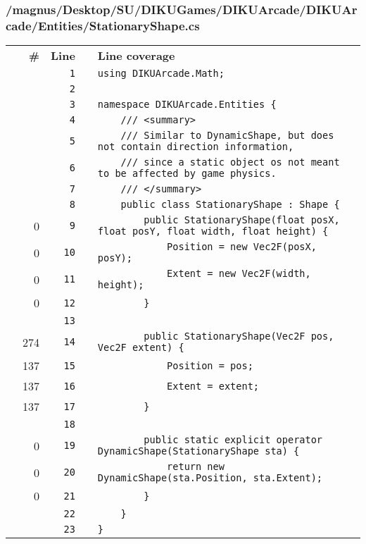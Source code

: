 \documentclass[a4paper,landscape,10pt]{article}
\begin{document}
\subsubsection{/magnus/Desktop/SU/DIKUGames/DIKUArcade/DIKUArcade/Entities/StationaryShape.cs}
\begin{longtable}[l]{lrrll}
\textbf{} & \textbf{\#} & \textbf{Line} & \textbf{} & \textbf{Line coverage}\\
\cellcolor{gray} &  & \verb~1~ & & \verb~using DIKUArcade.Math;~\\
\cellcolor{gray} &  & \verb~2~ & & \verb~~\\
\cellcolor{gray} &  & \verb~3~ & & \verb~namespace DIKUArcade.Entities {~\\
\cellcolor{gray} &  & \verb~4~ & & \verb~    /// <summary>~\\
\cellcolor{gray} &  & \verb~5~ & & \verb~    /// Similar to DynamicShape, but does not contain direction information,~\\
\cellcolor{gray} &  & \verb~6~ & & \verb~    /// since a static object os not meant to be affected by game physics.~\\
\cellcolor{gray} &  & \verb~7~ & & \verb~    /// </summary>~\\
\cellcolor{gray} &  & \verb~8~ & & \verb~    public class StationaryShape : Shape {~\\
\cellcolor{red} & 0 & \verb~9~ & & \verb~        public StationaryShape(float posX, float posY, float width, float height) {~\\
\cellcolor{red} & 0 & \verb~10~ & & \verb~            Position = new Vec2F(posX, posY);~\\
\cellcolor{red} & 0 & \verb~11~ & & \verb~            Extent = new Vec2F(width, height);~\\
\cellcolor{red} & 0 & \verb~12~ & & \verb~        }~\\
\cellcolor{gray} &  & \verb~13~ & & \verb~~\\
\cellcolor{green} & 274 & \verb~14~ & & \verb~        public StationaryShape(Vec2F pos, Vec2F extent) {~\\
\cellcolor{green} & 137 & \verb~15~ & & \verb~            Position = pos;~\\
\cellcolor{green} & 137 & \verb~16~ & & \verb~            Extent = extent;~\\
\cellcolor{green} & 137 & \verb~17~ & & \verb~        }~\\
\cellcolor{gray} &  & \verb~18~ & & \verb~~\\
\cellcolor{red} & 0 & \verb~19~ & & \verb~        public static explicit operator DynamicShape(StationaryShape sta) {~\\
\cellcolor{red} & 0 & \verb~20~ & & \verb~            return new DynamicShape(sta.Position, sta.Extent);~\\
\cellcolor{red} & 0 & \verb~21~ & & \verb~        }~\\
\cellcolor{gray} &  & \verb~22~ & & \verb~    }~\\
\cellcolor{gray} &  & \verb~23~ & & \verb~}~\\
\end{longtable}
\newpage
\end{document}
